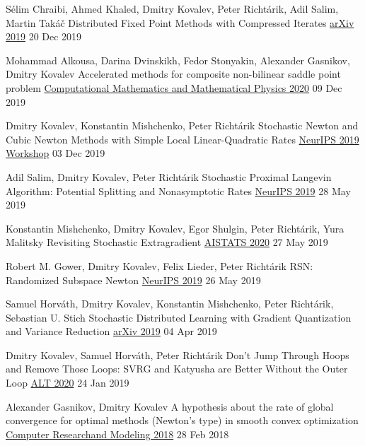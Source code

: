 \begin{cventries}
\cventry
{Sélim Chraibi, Ahmed Khaled, Dmitry Kovalev, Peter Richtárik, Adil Salim, Martin Takáč} %
{Distributed Fixed Point Methods with Compressed Iterates} %
{\href{https://arxiv.org/abs/1912.09925}{arXiv 2019}} 
{20 Dec 2019} %
{}	

\cventry
{Mohammad Alkousa, Darina Dvinskikh, Fedor Stonyakin, Alexander Gasnikov, Dmitry Kovalev} %
{Accelerated methods for composite non-bilinear saddle point problem} %
{\href{https://link.springer.com/article/10.1134/S0965542520110020}{Computational Mathematics and Mathematical Physics 2020}} 
{09 Dec 2019} %
{}	

\cventry
{Dmitry Kovalev, Konstantin Mishchenko, Peter Richtárik} %
{Stochastic Newton and Cubic Newton Methods with Simple Local Linear-Quadratic Rates} %
{\href{https://sites.google.com/site/optneurips19/}{NeurIPS 2019 Workshop}} 
{03 Dec 2019} %
{}	

\cventry
{Adil Salim, Dmitry Kovalev, Peter Richtárik} %
{Stochastic Proximal Langevin Algorithm: Potential Splitting and Nonasymptotic Rates} %
{\href{https://papers.nips.cc/paper/8891-stochastic-proximal-langevin-algorithm-potential-splitting-and-nonasymptotic-rates}{NeurIPS 2019}} 
{28 May 2019} %
{}	

\cventry
{Konstantin Mishchenko, Dmitry Kovalev, Egor Shulgin, Peter Richtárik, Yura Malitsky} %
{Revisiting Stochastic Extragradient} %
{\href{http://proceedings.mlr.press/v108/mishchenko20a}{AISTATS 2020}} 
{27 May 2019} %
{}	

\cventry
{Robert M. Gower, Dmitry Kovalev, Felix Lieder, Peter Richtárik} %
{RSN: Randomized Subspace Newton} %
{\href{https://papers.nips.cc/paper/8351-rsn-randomized-subspace-newton}{NeurIPS 2019}} 
{26 May 2019} %
{}	


\cventry
{Samuel Horváth, Dmitry Kovalev, Konstantin Mishchenko, Peter Richtárik, Sebastian U. Stich} %
{Stochastic Distributed Learning with Gradient Quantization and Variance Reduction} %
{\href{https://arxiv.org/abs/1904.05115}{arXiv 2019}} 
{04 Apr 2019} %
{}	

\cventry
{Dmitry Kovalev, Samuel Horváth, Peter Richtárik} %
{Don't Jump Through Hoops and Remove Those Loops: SVRG and Katyusha are Better Without the Outer Loop} %
{\href{http://proceedings.mlr.press/v117/kovalev20a}{ALT 2020}} 
{24 Jan 2019} %
{}	

\cventry
{Alexander Gasnikov, Dmitry Kovalev} %
{A hypothesis about the rate of global convergence for optimal methods (Newton's type) in smooth convex optimization} %
{\href{http://www.mathnet.ru/php/archive.phtml?wshow=paper\&jrnid=crm\&paperid=253\&option\_lang=eng}{
						Computer Research\linebreak and Modeling  2018}} 
{28 Feb 2018} %
{}	


\end{cventries}
